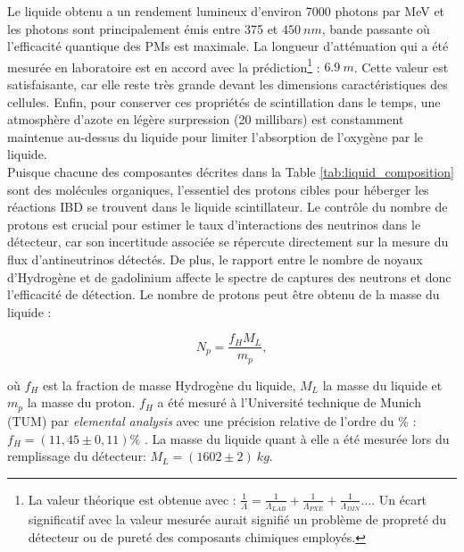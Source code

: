 Le liquide obtenu a un rendement lumineux d'environ 7000 photons par MeV et les photons sont principalement émis entre 375 et $\SI{450}{nm}$, bande passante où l'efficacité quantique des PMs est maximale. La longueur d'atténuation qui a été mesurée en laboratoire est en accord avec la prédiction\footnote{La valeur théorique est obtenue avec : $\frac{1}{\Lambda} = \frac{1}{\Lambda_{LAB}} + \frac{1}{\Lambda_{PXE}} + \frac{1}{\Lambda_{DIN}}...$. Un écart significatif avec la valeur mesurée aurait signifié un problème de propreté du détecteur ou de pureté des composants chimiques employés.} : $\SI{6.9}{m}$. Cette valeur est satisfaisante, car elle reste très grande devant les dimensions caractéristiques des cellules. Enfin, pour conserver ces propriétés de scintillation dans le temps, une atmosphère d'azote en légère surpression (20 millibars) est constamment maintenue au-dessus du liquide pour limiter l'absorption de l'oxygène par le liquide.\\ 

Puisque chacune des composantes décrites dans la Table \ref{tab:liquid_composition} sont des molécules organiques, l'essentiel des protons cibles pour héberger les réactions IBD se trouvent dans le liquide scintillateur. Le contrôle du nombre de protons est crucial pour estimer le taux d'interactions des neutrinos dans le détecteur, car son incertitude associée se répercute directement sur la mesure du flux d'antineutrinos détectés. De plus, le rapport entre le nombre de noyaux d'Hydrogène et de gadolinium affecte le spectre de captures des neutrons et donc l'efficacité de détection. Le nombre de protons peut être obtenu de la masse du liquide : 

\begin{equation} 
N_p = \frac{f_H M_L}{m_p},
\end{equation} 

\bigbreak 

où $f_H$ est la fraction de masse Hydrogène du liquide, $M_L$ la masse du liquide et $m_p$ la masse du proton. $f_H$ a été mesuré à l'Université technique de Munich (TUM) par \og \textit{elemental analysis} \fg{} avec une précision relative de l'ordre du \% : $f_H = \left( 11,45 \pm 0,11 \right) \%$ \cite{docdb517}. La masse du liquide quant à elle a été mesurée lors du remplissage du détecteur: $M_L = (1602 \pm 2) \SI{}{kg}$.\\ 


